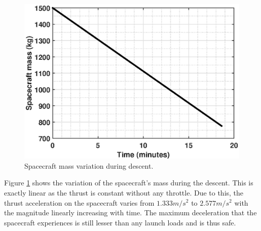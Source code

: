 \begin{figure}[H]
	\centering\includegraphics[width=0.90\linewidth]{Mass.eps}
	\caption{Spacecraft mass variation during descent.}
	\label{mass:fig}
\end{figure}

Figure \ref{mass:fig} shows the variation of the spacecraft's mass during the descent. This is exactly linear as the thrust is constant without any throttle. Due to this, the thrust acceleration on the spacecraft varies from $1.333m/s^2$ to $2.577m/s^2$ with the magnitude linearly increasing with time. The maximum deceleration that the spacecraft experiences is still lesser than any launch loads and is thus safe.

